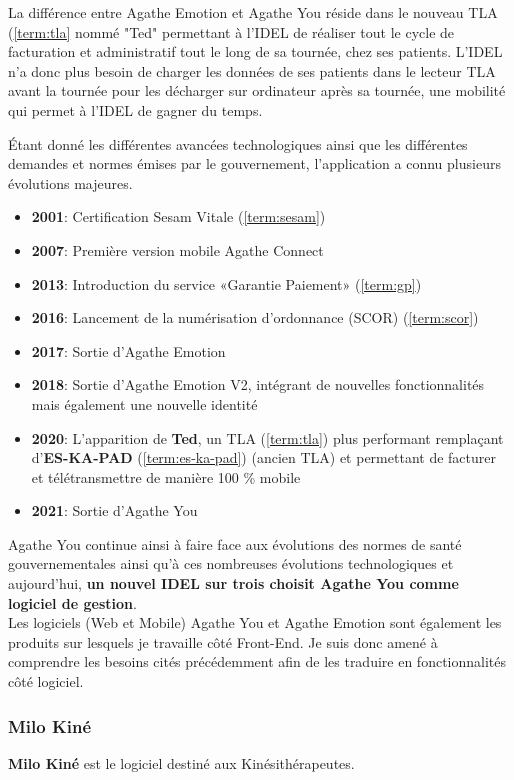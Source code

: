 \documentclass{article}
\begin{document}
La différence entre Agathe Emotion et Agathe You réside dans le nouveau TLA (\ref{term:tla} nommé "Ted" permettant à l'IDEL de réaliser tout le cycle de facturation et administratif tout le long de sa tournée, chez ses patients. L'IDEL n'a donc plus besoin de charger les données de ses patients dans le lecteur TLA avant la tournée pour les décharger sur ordinateur après sa tournée, une mobilité qui permet à l'IDEL de gagner du temps.

Étant donné les différentes avancées technologiques ainsi que les différentes demandes et normes émises par le gouvernement, l'application a connu plusieurs évolutions majeures.

\begin{itemize}
    \item \textbf{2001}: Certification Sesam Vitale (\ref{term:sesam})
    \item \textbf{2007}: Première version mobile Agathe Connect
    \item \textbf{2013}: Introduction du service «Garantie Paiement» (\ref{term:gp})
    \item \textbf{2016}: Lancement de la numérisation d'ordonnance (SCOR) (\ref{term:scor})
    \item \textbf{2017}: Sortie d'Agathe Emotion
    \item \textbf{2018}: Sortie d'Agathe Emotion V2, intégrant de nouvelles fonctionnalités mais également une nouvelle identité
    \item \textbf{2020}: L'apparition de \textbf{Ted}, un TLA (\ref{term:tla}) plus performant remplaçant d'\textbf{ES-KA-PAD} (\ref{term:es-ka-pad}) (ancien TLA) et permettant de facturer et télétransmettre de manière 100 \% mobile
    \item \textbf{2021}: Sortie d'Agathe You
\end{itemize}

Agathe You continue ainsi à faire face aux évolutions des normes de santé gouvernementales ainsi qu'à ces nombreuses évolutions technologiques et aujourd'hui, \textbf{un nouvel IDEL sur trois choisit Agathe You comme logiciel de gestion}. \\

Les logiciels (Web et Mobile) Agathe You et Agathe Emotion sont également les produits sur lesquels je travaille côté Front-End. Je suis donc amené à comprendre les besoins cités précédemment afin de les traduire en fonctionnalités côté logiciel.

\subsubsection{Milo Kiné}
\textbf{Milo Kiné} est le logiciel destiné aux Kinésithérapeutes.
\end{document}
